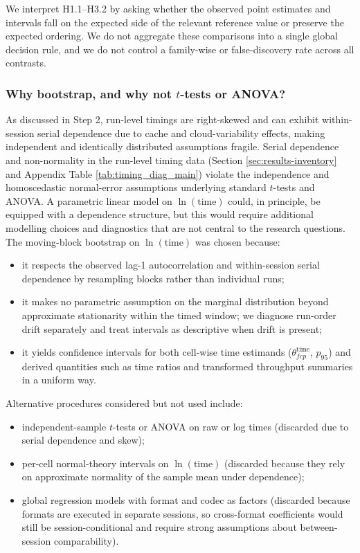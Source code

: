 \documentclass[nomenclature, english, bibtex]{kththesis}
\numberwithin{listing}{chapter}
\begin{document}
We interpret H1.1--H3.2 by asking whether the observed point estimates and intervals fall on the expected side of the relevant reference value or preserve the expected ordering. We do not aggregate these comparisons into a single global decision rule, and we do not control a family-wise or false-discovery rate across all contrasts.

\subsubsection{Why bootstrap, and why not \texorpdfstring{$t$}{t}-tests or \texorpdfstring{\gls{ANOVA}}{ANOVA}?}
As discussed in Step 2, run-level timings are right-skewed and can exhibit within-session serial dependence due to cache and cloud-variability effects, making independent and identically distributed assumptions fragile. Serial dependence and non-normality in the run-level timing data (Section \ref{sec:results-inventory} and Appendix Table \ref{tab:timing_diag_main}) violate the independence and homoscedastic normal-error assumptions underlying standard $t$-tests and \gls{ANOVA}. A parametric linear model on $\ln(\text{time})$ could, in principle, be equipped with a dependence structure, but this would require additional modelling choices and diagnostics that are not central to the research questions. The moving-block bootstrap on $\ln(\text{time})$ was chosen because:
\begin{itemize}
  \item it respects the observed lag-1 autocorrelation and within-session serial dependence by resampling blocks rather than individual runs;
  \item it makes no parametric assumption on the marginal distribution beyond approximate stationarity within the timed window; we diagnose run-order drift separately and treat intervals as descriptive when drift is present;
  \item it yields confidence intervals for both cell-wise time estimands ($\theta^{\mathrm{time}}_{fcp}$, $p_{95}$) and derived quantities such as time ratios and transformed throughput summaries in a uniform way.
\end{itemize}

Alternative procedures considered but not used include:
\begin{itemize}
  \item independent-sample $t$-tests or \gls{ANOVA} on raw or log times (discarded due to serial dependence and skew);
  \item per-cell normal-theory intervals on $\ln(\text{time})$ (discarded because they rely on approximate normality of the sample mean under dependence);
  \item global regression models with format and codec as factors (discarded because formats are executed in separate sessions, so cross-format coefficients would still be session-conditional and require strong assumptions about between-session comparability).
\end{itemize}
\end{document}
